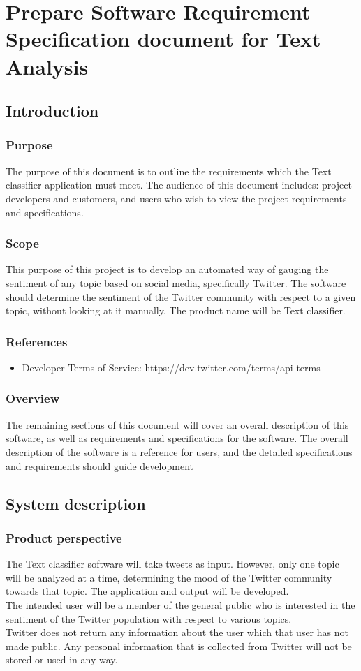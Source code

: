 \chapter{Prepare Software Requirement Specification document for Text Analysis}
\label{Practical:3}
\section{Introduction}
\subsection{Purpose}
The purpose of this document is to outline the requirements which the Text classifier application must meet. The audience of this document includes: project developers and customers, and users who wish to view the project requirements and specifications.
\subsection{Scope}
This purpose of this project is to develop an automated way of gauging the sentiment of any topic based on social media, specifically Twitter. The software should determine the sentiment of the Twitter community with respect to a given topic, without looking at it manually. The product name will be Text classifier.
\subsection{References}
\begin{itemize}
\item Developer Terms of Service: https://dev.twitter.com/terms/api-terms 
\end{itemize}
\subsection{Overview}
The remaining sections of this document will cover an overall description of this software, as well as requirements and specifications for the software. The overall description of the software is a reference for users, and the detailed specifications and requirements should guide development
\section{System description}
\subsection{Product perspective}
The Text classifier  software  will  take  tweets   as input. However, only one topic    will be analyzed at a time, determining the mood of the Twitter community towards that topic. The application and output will be developed.\\
The intended user will be a member of the general public who is interested in the sentiment of the Twitter population with respect to various topics. \\
Twitter does not return any information about the user which that user has not made public. Any personal information that is collected from Twitter will not be stored or used in any way.

